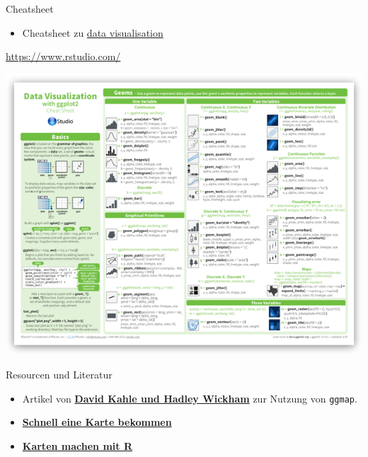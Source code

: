 \documentclass[ignorenonframetext,]{beamer}
\providecommand{\tightlist}{%
  \setlength{\itemsep}{0pt}\setlength{\parskip}{0pt}}
\begin{document}
\begin{frame}{Cheatsheet}

\begin{itemize}
\tightlist
\item
  Cheatsheet zu
  \href{https://www.rstudio.com/wp-content/uploads/2015/04/ggplot2-cheatsheet.pdf}{data
  visualisation}
\end{itemize}

\url{https://www.rstudio.com/}

\includegraphics{figure/ggplot2-cheatsheet.png}

\end{frame}

\begin{frame}[fragile]{Resourcen und Literatur}

\begin{itemize}
\item
  Artikel von
  \href{http://journal.r-project.org/archive/2013-1/kahle-wickham.pdf}{\textbf{David
  Kahle und Hadley Wickham}} zur Nutzung von \texttt{ggmap}.
\item
  \href{http://rpackages.ianhowson.com/cran/ggmap/man/get_map.html}{\textbf{Schnell
  eine Karte bekommen}}
\item
  \href{http://www.kevjohnson.org/making-maps-in-r-part-2/}{\textbf{Karten
  machen mit R}}
\end{itemize}

\end{frame}
\end{document}
